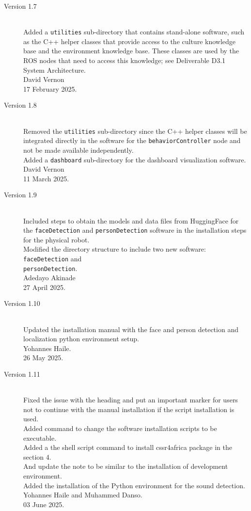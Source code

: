 \documentclass{CSSRforAfrica}
\begin{document}
{\begin{description}
\item [Version 1.7]~\\
Added  a {\small \tt utilities} sub-directory that contains stand-alone software, such as the C++ helper classes that provide access to the culture knowledge base and the environment knowledge base. These classes are used by the ROS nodes that need to access this knowledge; see Deliverable D3.1 System Architecture.\\
David Vernon \\       
17 February 2025.


\item [Version 1.8]~\\
Removed  the {\small \tt utilities} sub-directory since the C++ helper classes will be integrated directly in the software for the {\small \tt behaviorController} node and not be made available independently.\\
Added a  {\small \tt dashboard} sub-directory for the dashboard visualization software.\\
David Vernon \\       
11 March 2025.

\item [Version 1.9]~\\
Included steps to obtain the models and data files from HuggingFace for the \texttt{faceDetection} and \texttt{personDetection} software in the installation steps for the physical robot.\\
Modified the directory structure to include two new software: \texttt{faceDetection} and \\ \texttt{personDetection}.\\
Adedayo Akinade \\       
27 April 2025.

\item [Version 1.10]~\\
Updated the installation manual with the face and person detection and localization python environment setup.\\
Yohannes Haile.\\    
26 May 2025.

\item [Version 1.11]~\\
Fixed the issue with the heading and put an important marker for users not to continue with the manual installation if the script installation is used. \\
Added command to change the software installation scripts to be executable.\\
Added a the shell script command to install cssr4africa package in the section 4.\\
And update the note to be similar to the installation of development environment. \\
Added the installation of the Python environment for the sound detection. \\
Yohannes Haile and Muhammed Danso.\\
03 June 2025.


\end{description}}
\end{document}
